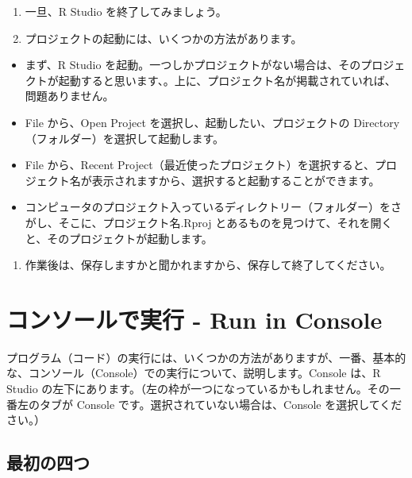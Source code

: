 \documentclass[
  xelatex, ja=standard]{bxjsbook}
\providecommand{\tightlist}{%
  \setlength{\itemsep}{0pt}\setlength{\parskip}{0pt}}
\theoremstyle{definition}
\theoremstyle{definition}
\theoremstyle{definition}
\theoremstyle{definition}
\theoremstyle{remark}
\begin{document}
\begin{enumerate}
\def\labelenumi{\arabic{enumi}.}
\setcounter{enumi}{2}
\item
  一旦、R Studio を終了してみましょう。
\item
  プロジェクトの起動には、いくつかの方法があります。
\end{enumerate}

\begin{itemize}
\tightlist
\item
  まず、R Studio を起動。一つしかプロジェクトがない場合は、そのプロジェクトが起動すると思います、。上に、プロジェクト名が掲載されていれば、問題ありません。
\item
  File から、Open Project を選択し、起動したい、プロジェクトの Directory（フォルダー）を選択して起動します。
\item
  File から、Recent Project（最近使ったプロジェクト）を選択すると、プロジェクト名が表示されますから、選択すると起動することができます。
\item
  コンピュータのプロジェクト入っているディレクトリー（フォルダー）をさがし、そこに、プロジェクト名.Rproj とあるものを見つけて、それを開くと、そのプロジェクトが起動します。
\end{itemize}

\begin{enumerate}
\def\labelenumi{\arabic{enumi}.}
\setcounter{enumi}{4}
\tightlist
\item
  作業後は、保存しますかと聞かれますから、保存して終了してください。
\end{enumerate}

\hypertarget{ux30b3ux30f3ux30bdux30fcux30ebux3067ux5b9fux884c---run-in-console}{%
\section{コンソールで実行 - Run in Console}\label{ux30b3ux30f3ux30bdux30fcux30ebux3067ux5b9fux884c---run-in-console}}

プログラム（コード）の実行には、いくつかの方法がありますが、一番、基本的な、コンソール（Console）での実行について、説明します。Console は、R Studio の左下にあります。（左の枠が一つになっているかもしれません。その一番左のタブが Console です。選択されていない場合は、Console を選択してください。）

\hypertarget{ux6700ux521dux306eux56dbux3064}{%
\subsection{最初の四つ}\label{ux6700ux521dux306eux56dbux3064}}
\end{document}

